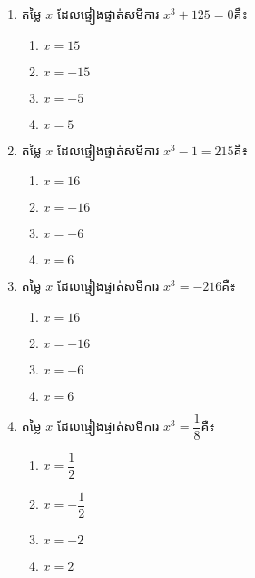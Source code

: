 \begin{enumerate}
\item តម្លៃ $x$ ដែលផ្ទៀងផ្ទាត់សមីការ $x^3+125=0$គឺ៖
\begin{multicols}{4}
\begin{enumerate}[label=\alph*.]
	\item $x=15$
	\item $x=-15$
	\item $x=-5$
	\item $x=5$
\end{enumerate}
\end{multicols}

\item តម្លៃ $x$ ដែលផ្ទៀងផ្ទាត់សមីការ $x^3-1=215$គឺ៖
\begin{multicols}{4}
\begin{enumerate}[label=\alph*.]
	\item $x=16$
	\item $x=-16$
	\item $x=-6$
	\item $x=6$
\end{enumerate}
\end{multicols}

\item តម្លៃ $x$ ដែលផ្ទៀងផ្ទាត់សមីការ $x^3=-216$គឺ៖
\begin{multicols}{4}
\begin{enumerate}[label=\alph*.]
	\item $x=16$
	\item $x=-16$
	\item $x=-6$
	\item $x=6$
\end{enumerate}
\end{multicols}
\item តម្លៃ $x$ ដែលផ្ទៀងផ្ទាត់សមីការ $x^3=\dfrac{1}{8}$គឺ៖
\begin{multicols}{4}
\begin{enumerate}[label=\alph*.]
	\item $x=\dfrac{1}{2}$
	\item $x=-\dfrac{1}{2}$
	\item $x=-2$
	\item $x=2$
\end{enumerate}
\end{multicols}


\end{enumerate}
